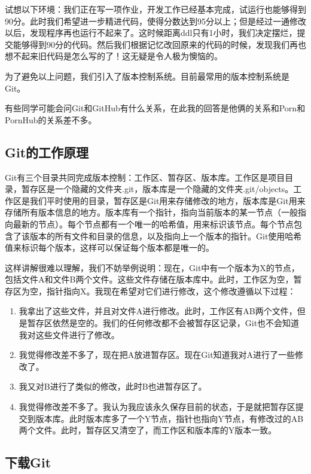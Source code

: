 \documentclass[../main.tex]{subfiles}
\begin{document}
试想以下环境：我们正在写一项作业，开发工作已经基本完成，试运行也能够得到90分。此时我们希望进一步精进代码，使得分数达到95分以上；但是经过一通修改以后，发现程序再也运行不起来了。这时候距离ddl只有1小时，我们决定摆烂，提交能够得到90分的代码。然后我们根据记忆改回原来的代码的时候，发现我们再也想不起来旧代码是怎么写的了！这无疑是令人极为懊恼的。

为了避免以上问题，我们引入了版本控制系统。目前最常用的版本控制系统是Git。

有些同学可能会问Git和GitHub有什么关系，在此我的回答是他俩的关系和Porn和PornHub的关系差不多。

\subsection{Git的工作原理}

Git有三个目录共同完成版本控制：工作区、暂存区、版本库。工作区是项目目录，暂存区是一个隐藏的文件夹.git，版本库是一个隐藏的文件夹.git/objects。工作区是我们平时使用的目录，暂存区是Git用来存储修改的地方，版本库是Git用来存储所有版本信息的地方。版本库有一个指针，指向当前版本的某一节点（一般指向最新的节点）。每个节点都有一个唯一的哈希值，用来标识该节点。每个节点包含了该版本的所有文件和目录的信息，以及指向上一个版本的指针。Git使用哈希值来标识每个版本，这样可以保证每个版本都是唯一的。

这样讲解很难以理解，我们不妨举例说明：现在，Git中有一个版本为X的节点，包括文件A和文件B两个文件。这些文件存储在版本库中。此时，工作区为空，暂存区为空，指针指向X。我现在希望对它们进行修改，这个修改遵循以下过程：

\begin{enumerate}
    \item 我拿出了这些文件，并且对文件A进行修改。此时，工作区有AB两个文件，但是暂存区依然是空的。我们的任何修改都不会被暂存区记录，Git也不会知道我对这些文件进行了修改。
    \item 我觉得修改差不多了，现在把A放进暂存区。现在Git知道我对A进行了一些修改了。
    \item 我又对B进行了类似的修改，此时B也进暂存区了。
    \item 我觉得修改差不多了。我认为我应该永久保存目前的状态，于是就把暂存区提交到版本库。此时版本库多了一个Y节点，指针也指向Y节点，有修改过的AB两个文件。此时，暂存区又清空了，而工作区和版本库的Y版本一致。
\end{enumerate}

\subsection{下载Git}
\end{document}
